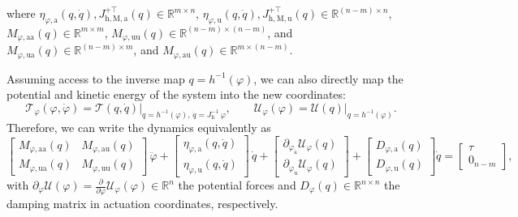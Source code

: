 where $\eta_{\varphi,\mathrm{a}}(q,\dot{q}), J_{\mathrm{h},\mathrm{M},\mathrm{a}}^{+\top}(q) \in \mathbb{R}^{m \times n}$, $\eta_{\varphi,\mathrm{u}}(q,\dot{q}), J_{\mathrm{h},\mathrm{M},\mathrm{u}}^{+\top}(q) \in \mathbb{R}^{(n-m) \times n}$, $M_{\varphi,\mathrm{aa}}(q) \in \mathbb{R}^{m \times m}$, $M_{\varphi,\mathrm{uu}}(q) \in \mathbb{R}^{(n-m) \times (n-m)}$, and $M_{\varphi,\mathrm{ua}}(q) \in \mathbb{R}^{(n-m) \times m}$, and $M_{\varphi,\mathrm{au}}(q) \in \mathbb{R}^{m \times (n-m)}$.

Assuming access to the inverse map $q = h^{-1}(\varphi)$, we can also directly map the potential and kinetic energy of the system into the new coordinates:
\begin{equation}
    \mathcal{T}_\varphi(\varphi, \dot{\varphi}) = \mathcal{T}\left ( q, \dot{q} \right ) \big |_{q=h^{-1}(\varphi), \, \dot{q}=J_\mathrm{h}^{-1} \, \varphi},
    \qquad
    \mathcal{U}_\varphi(\varphi) = \mathcal{U}\left ( q \right ) \big |_{q=h^{-1}(\varphi)}.
\end{equation}
Therefore, we can write the dynamics equivalently as
\begin{equation}
    \begin{bmatrix}
        M_{\varphi,\mathrm{aa}}(q) & M_{\varphi,\mathrm{au}}(q)\\ 
        M_{\varphi,\mathrm{ua}}(q) & M_{\varphi,\mathrm{uu}}(q)
    \end{bmatrix} \, \ddot{\varphi} + \begin{bmatrix}
        \eta_{\varphi,\mathrm{a}}(q,\dot{q})\\ \eta_{\varphi,\mathrm{u}}(q,\dot{q})
    \end{bmatrix} \, \dot{q} + \begin{bmatrix}
        \partial_{\varphi_\mathrm{a}} \mathcal{U}_\varphi(q)\\
        \partial_{\varphi_\mathrm{u}} \mathcal{U}_\varphi(q)
    \end{bmatrix} + \begin{bmatrix}
        D_{\varphi,\mathrm{a}}(q)\\
        D_{\varphi,\mathrm{u}}(q)
    \end{bmatrix} \dot{q} = \begin{bmatrix}
        \tau\\ 0_{n-m}
    \end{bmatrix},
\end{equation}
with $\partial_\varphi \mathcal{U}(\varphi) = \frac{\partial }{\partial \varphi}  \mathcal{U}_\varphi(\varphi) \in \mathbb{R}^n$ the potential forces and $D_{\varphi}(q) \in \mathbb{R}^{n \times n}$ the damping matrix in actuation coordinates, respectively.